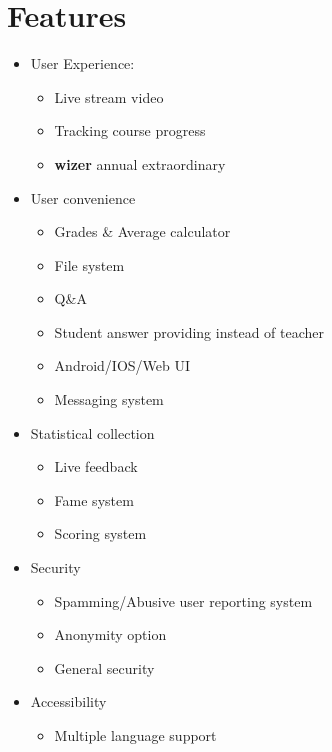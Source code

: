 \documentclass{article}
\begin{document}
\section{Features}

\begin{itemize}
\item User Experience: 
\begin{itemize}
\item Live stream video
\item Tracking course progress
\item \textbf{wizer} annual extraordinary
\end{itemize}
\item User convenience
\begin{itemize}
\item Grades & Average calculator
\item File system
\item Q&A
\item Student answer providing instead of teacher
\item Android/IOS/Web UI
\item Messaging system
\end{itemize}
\item Statistical collection
\begin{itemize}
\item Live feedback
\item Fame system
\item Scoring system
\end{itemize}
\item Security
\begin{itemize}
\item Spamming/Abusive user reporting system
\item Anonymity option 
\item General security
\end{itemize}
\item Accessibility 
\begin{itemize}
\item Multiple language support
\end{itemize}
\end{itemize}
\end{document}
